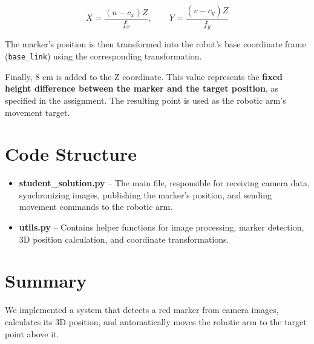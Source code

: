 \documentclass[11pt,a4paper]{article}
\begin{document}
\begin{equation}
    X = \frac{(u-c_x)Z}{f_x},
    \qquad
    Y = \frac{(v-c_y)Z}{f_y}
\end{equation}

The marker's position is then transformed into the robot's base coordinate frame (\texttt{base\_link}) using the corresponding transformation.

Finally, 8 cm is added to the Z coordinate. This value represents the \textbf{fixed height difference between the marker and the target position}, as specified in the assignment. The resulting point is used as the robotic arm's movement target.

\section{Code Structure}

\begin{itemize}[leftmargin=*]
    \item \textbf{student\_solution.py} -- The main file, responsible for receiving camera data, synchronizing images, publishing the marker's position, and sending movement commands to the robotic arm.

    \item \textbf{utils.py} -- Contains helper functions for image processing, marker detection, 3D position calculation, and coordinate transformations.
\end{itemize}

\section{Summary}

We implemented a system that detects a red marker from camera images, calculates its 3D position, and automatically moves the robotic arm to the target point above it.
\end{document}
